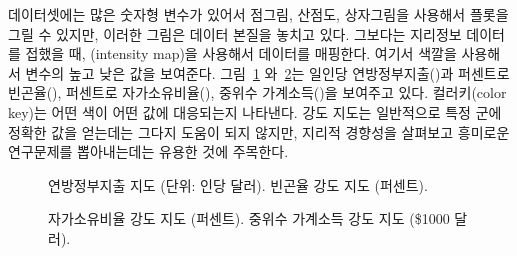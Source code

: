  데이터셋에는 많은 숫자형 변수가 있어서 점그림, 산점도, 상자그림을 사용해서 플롯을 그릴 수 있지만, 이러한 그림은 데이터 본질을 놓치고 있다. 그보다는 지리정보 데이터를 접했을 때, (intensity map)을 사용해서 데이터를 매핑한다. 여기서 색깔을 사용해서 변수의 높고 낮은 값을 보여준다.
그림~\ref{countyIntensityMaps1} 와~\ref{countyIntensityMaps2}는 일인당 연방정부지출()과 퍼센트로 빈곤율(), 퍼센트로 자가소유비율(), 중위수 가계소득()을 보여주고 있다.
컬러키(color key)는 어떤 색이 어떤 값에 대응되는지 나타낸다.
강도 지도는 일반적으로 특정 군에 정확한 값을 얻는데는 그다지 도움이 되지 않지만, 지리적 경향성을 살펴보고 흥미로운 연구문제를 뽑아내는데는 유용한 것에 주목한다.

\begin{figure}
\centering
{}
\caption{ 연방정부지출 지도 (단위: 인당 달러).  빈곤율 강도 지도 (퍼센트).}
\label{countyIntensityMaps1}
\end{figure}

\begin{figure}
\centering
{}
\caption{ 자가소유비율 강도 지도 (퍼센트).  중위수 가계소득 강도 지도 (\$1000 달러).}
\label{countyIntensityMaps2}
\end{figure}

\textC{\pagebreak}

